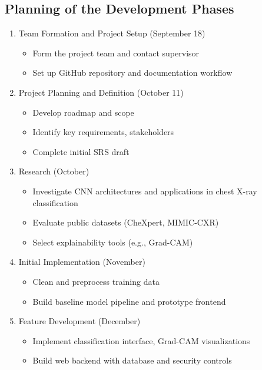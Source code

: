 \documentclass[12pt]{article}
\begin{document}
\subsection{Planning of the Development Phases}
\begin{enumerate}
    \item {
        Team Formation and Project Setup (September 18)
        \begin{itemize}
            \item Form the project team and contact supervisor
            \item Set up GitHub repository and documentation workflow
        \end{itemize}
    }
    \item {
        Project Planning and Definition (October 11)
        \begin{itemize}
            \item Develop roadmap and scope
            \item Identify key requirements, stakeholders
            \item Complete initial SRS draft
        \end{itemize}
    }
    \item {
        Research (October)
        \begin{itemize}
            \item Investigate CNN architectures and applications in chest X-ray classification
            \item Evaluate public datasets (CheXpert, MIMIC-CXR)
            \item Select explainability tools (e.g., Grad-CAM)
        \end{itemize}
    }
    \item {
        Initial Implementation (November)
        \begin{itemize}
            \item Clean and preprocess training data
            \item Build baseline model pipeline and prototype frontend
        \end{itemize}
    }
    \item {
        Feature Development (December)
        \begin{itemize}
            \item Implement classification interface, Grad-CAM visualizations
            \item Build web backend with database and security controls
        \end{itemize}
}
\end{enumerate}
\end{document}
